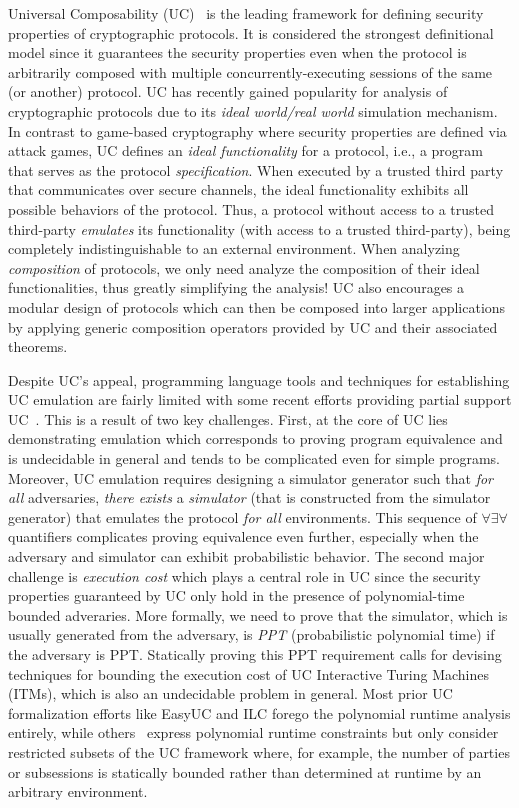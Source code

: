Universal Composability (UC)~\cite{canettiUC} is the leading framework for defining security properties of cryptographic protocols.
It is considered the strongest definitional model since it guarantees the security properties even when the protocol is arbitrarily composed with
multiple concurrently-executing sessions of the same (or another) protocol.
UC has recently gained popularity for analysis of cryptographic protocols due to its \emph{ideal world/real world} simulation mechanism.
In contrast to game-based cryptography where security properties are defined via attack games,
UC defines an \emph{ideal functionality} for a protocol, i.e., a program that serves as the protocol \emph{specification}.
When executed by a trusted third party that communicates over secure channels, the ideal functionality exhibits all possible behaviors of the protocol.
Thus, a protocol without access to a trusted third-party \emph{emulates} its functionality (with access to a trusted third-party),
being completely indistinguishable to an external environment.
When analyzing \emph{composition} of protocols, we only need analyze the composition of their ideal functionalities, thus greatly
simplifying the analysis!
UC also encourages a modular design of protocols which can then be composed into larger applications by applying generic composition operators
provided by UC and their associated theorems.

Despite UC's appeal, programming language tools and techniques for establishing UC emulation are fairly limited with some recent efforts providing
partial support UC~\cite{ilc,easyuc,ipdl,symbolicuc,barbosa}. This is a result of two key challenges.
First, at the core of UC lies demonstrating emulation which corresponds to proving program equivalence and is undecidable in general
and tends to be complicated even for simple programs.
Moreover, UC emulation requires designing a simulator generator such that \emph{for all} adversaries, \emph{there exists} a \emph{simulator} (that is constructed
from the simulator generator) that emulates the protocol \emph{for all} environments.
This sequence of $\forall \exists \forall$ quantifiers complicates proving equivalence even further, especially when the adversary and simulator can exhibit
probabilistic behavior.
The second major challenge is \emph{execution cost} which plays a central role in UC since the security properties
guaranteed by UC only hold in the presence of polynomial-time bounded adveraries.
More formally, we need to prove that the simulator, which is usually generated from the adversary, is \emph{PPT} (probabilistic polynomial time)
if the adversary is PPT.
Statically proving this PPT requirement calls for devising techniques for bounding the execution cost of UC Interactive Turing Machines (ITMs),
which is also an undecidable problem in general.
Most prior UC formalization efforts like EasyUC and ILC forego the polynomial runtime analysis entirely, while others~\cite{ipdl,barbosa,ilc}
express polynomial runtime constraints but only consider restricted subsets of the UC framework where, for example, the number of parties
or subsessions is statically bounded rather than determined at runtime by an arbitrary environment.

